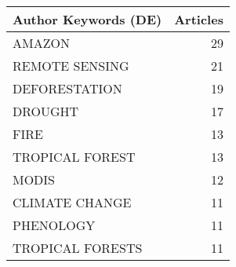 
\begin{tabular}{lr}
\toprule
Author Keywords (DE) & Articles\\
\midrule
AMAZON & 29\\
REMOTE SENSING & 21\\
DEFORESTATION & 19\\
DROUGHT & 17\\
FIRE & 13\\
\addlinespace
TROPICAL FOREST & 13\\
MODIS & 12\\
CLIMATE CHANGE & 11\\
PHENOLOGY & 11\\
TROPICAL FORESTS & 11\\
\bottomrule
\end{tabular}